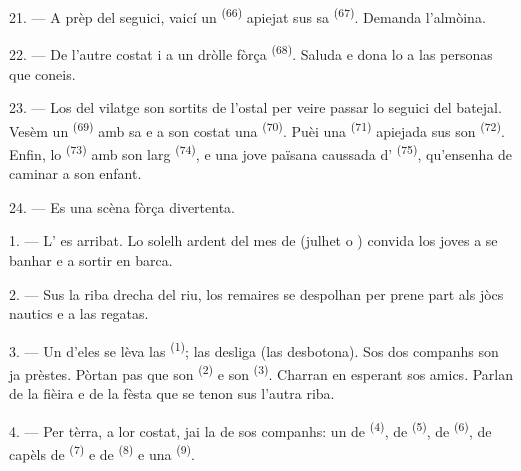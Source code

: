 \VUsaut{4.6mm}
\VUsaut{3.4mm}

21. --- A prèp del seguici, vaicí un  \textsuperscript{(66)}
apiejat sus sa  \textsuperscript{(67)}. Demanda l'almòina.

22. --- De l'autre costat i a un dròlle fòrça 
\textsuperscript{(68)}. Saluda e dona lo  a las personas que
coneis.

23. --- Los del vilatge son sortits de l'ostal per veire passar lo seguici del
batejal. Vesèm un  \textsuperscript{(69)} amb sa  e a son costat una  \textsuperscript{(70)}. Puèi una
 \textsuperscript{(71)} apiejada sus son 
\textsuperscript{(72)}. Enfin, lo  \textsuperscript{(73)} amb son
larg  \textsuperscript{(74)}, e una jove païsana caussada
d' \textsuperscript{(75)}, qu'ensenha de caminar a son enfant.

24. --- Es una scèna fòrça divertenta.
\VUsaut{4.0mm}

\VUsaut{3.0mm}

\VUsaut{2.4mm}

\VUsaut{3.0mm}

1. --- L' es arribat. Lo solelh ardent del mes de 
(julhet o ) convida los joves a se banhar e a sortir en barca.

2. --- Sus la riba drecha del riu, los remaires se despolhan per prene part als
jòcs nautics e a las regatas.

3. --- Un d'eles se lèva las  \textsuperscript{(1)}; las
desliga (las desbotona). Sos dos companhs son ja prèstes. Pòrtan pas que son
 \textsuperscript{(2)} e son 
\textsuperscript{(3)}. Charran en esperant sos amics. Parlan de la fièira e de la
fèsta que se tenon sus l'autra riba.

4. --- Per tèrra, a lor costat, jai la  de sos companhs: un
 de  \textsuperscript{(4)}, de 
\textsuperscript{(5)}, de  \textsuperscript{(6)}, de capèls de
 \textsuperscript{(7)} e de  \textsuperscript{(8)} e
una  \textsuperscript{(9)}.

